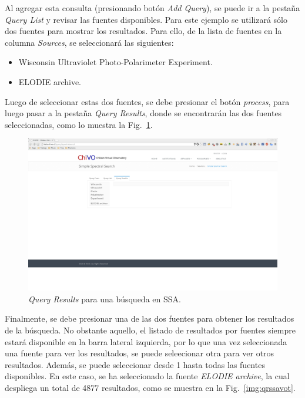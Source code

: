 Al agregar esta consulta (presionando botón \emph{Add Query}), se puede
ir a la pestaña \emph{Query List} y revisar las fuentes disponibles.
Para este ejemplo se utilizará sólo dos fuentes para mostrar los
resultados. Para ello, de la lista de fuentes en la columna
\emph{Sources}, se seleccionará las siguientes:

\begin{itemize}
  \item Wisconsin Ultraviolet Photo-Polarimeter Experiment.
  \item ELODIE archive.
\end{itemize}

Luego de seleccionar estas dos fuentes, se debe presionar el botón
\emph{process}, para luego pasar a la pestaña \emph{Query Results},
donde se encontrarán las dos fuentes seleccionadas, como lo muestra la
Fig.~\ref{img:qrssa}.

\begin{figure}[ht!]
    \begin{center}
	\includegraphics[scale=.2]{img/qrssa}
    \end{center}
    \caption{\emph{Query Results} para una búsqueda en SSA.}
    \label{img:qrssa}
\end{figure}

Finalmente, se debe presionar una de las dos fuentes para obtener los
resultados de la búsqueda. No obstante aquello, el listado de
resultados por fuentes siempre estará disponible en la barra lateral
izquierda, por lo que una vez seleccionada una fuente para ver los
resultados, se puede seleecionar otra para ver otros resultados.
Además, se puede seleccionar desde 1 hasta todas las fuentes
disponibles. En este caso, se ha seleccionado la fuente \emph{ELODIE
archive}, la cual despliega un total de 4877 resultados, como se
muestra en la Fig.~\ref{img:qrssavot}.

